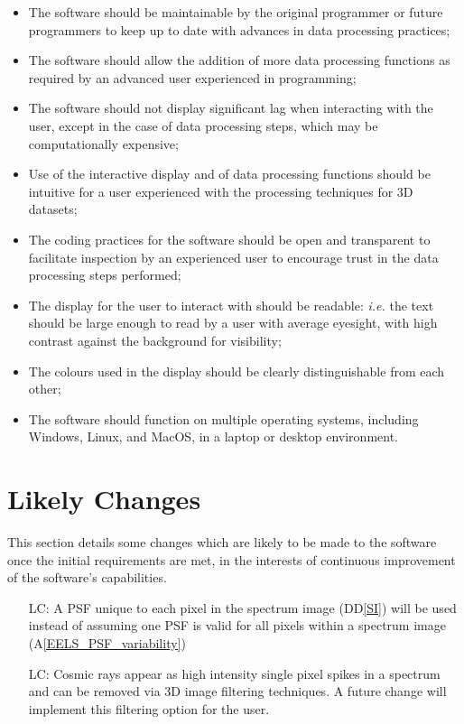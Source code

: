 \documentclass[12pt]{article}
\newcommand{\ddref}[1]{DD\ref{#1}}
\newcommand{\aref}[1]{A\ref{#1}}
\newcounter{lcnum} %
\begin{document}
\begin{itemize}
	\item The software should be maintainable by the original programmer or future programmers to keep up to date with advances in data processing practices;
	\item The software should allow the addition of more data processing functions as required by an advanced user experienced in programming;
	\item The software should not display significant lag when interacting with the user, except in the case of data processing steps, which may be computationally expensive;
	\item Use of the interactive display and of data processing functions should be intuitive for a user experienced with the processing techniques for 3D datasets;
	\item The coding practices for the software should be open and transparent to facilitate inspection by an experienced user to encourage trust in the data processing steps performed;
	\item The display for the user to interact with should be readable: \textit{i.e.} the text should be large enough to read by a user with average eyesight, with high contrast against the background for visibility;
	\item The colours used in the display should be clearly distinguishable from each other;
	\item The software should function on multiple operating systems, including Windows, Linux, and MacOS, in a laptop or desktop environment.
\end{itemize}

\section{Likely Changes}
	This section details some changes which are likely to be made to the software once the initial requirements are met, in the interests of continuous improvement of the software's capabilities.
	\noindent \begin{itemize}
		\item[LC\refstepcounter{lcnum}\thelcnum\label{LC_identicalPSF}:] A PSF unique to each pixel in the spectrum image (\ddref{SI}) will be used instead of assuming one PSF is valid for all pixels within a spectrum image (\aref{EELS_PSF_variability})
		\item[LC\refstepcounter{lcnum}\thelcnum\label{LC_identicalPSF}:] Cosmic rays appear as high intensity single pixel spikes in a spectrum and can be removed via 3D image filtering techniques. A future change will implement this filtering option for the user. 
	\end{itemize}
\end{document}
